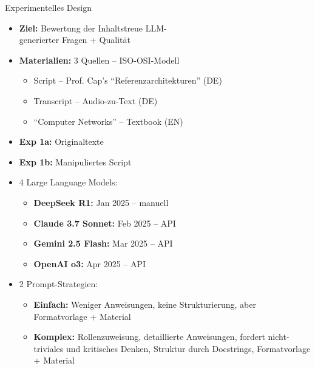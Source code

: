 \documentclass[usenames, dvipsnames, aspectratio=32]{beamer}
\begin{document}
\begin{frame}[allowframebreaks]{Experimentelles Design}
    \begin{itemize}
        \item \textbf{Ziel:} Bewertung der Inhaltstreue LLM-\\ generierter Fragen + Qualität
        \item \textbf{Materialien:} 3 Quellen -- ISO-OSI-Modell
        \begin{itemize}
            \item Script -- Prof. Cap's \enquote{Referenzarchitekturen} (DE)
            \item Transcript -- Audio-zu-Text (DE)  
            \item \enquote{Computer Networks} -- Textbook (EN)
        \end{itemize}
        \item \textbf{Exp 1a:} Originaltexte 
        \item \textbf{Exp 1b:} Manipuliertes Script 
        \framebreak
        \item 4 Large Language Models: 
            \begin{itemize}
                \item \textbf{DeepSeek R1:} Jan 2025 -- manuell
                \item \textbf{Claude 3.7 Sonnet:} Feb 2025 -- API
                \item \textbf{Gemini 2.5 Flash:} Mar 2025 -- API
                \item \textbf{OpenAI o3:} Apr 2025 -- API
            \end{itemize}
        \item 2 Prompt-Strategien:
            \begin{itemize}
                \item \textbf{Einfach:} Weniger Anweisungen, keine Strukturierung, aber Formatvorlage + Material
                \item \textbf{Komplex:} Rollenzuweisung, detaillierte Anweisungen, fordert nicht-triviales und kritisches Denken, Struktur durch Docstrings, Formatvorlage + Material 

\end{itemize}
\end{itemize}
\end{frame}
\end{document}
